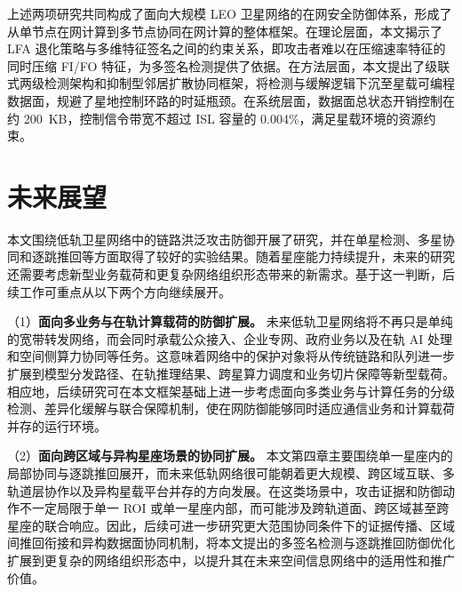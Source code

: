 上述两项研究共同构成了面向大规模 LEO 卫星网络的在网安全防御体系，形成了从单节点在网计算到多节点协同在网计算的整体框架。在理论层面，本文揭示了 LFA 退化策略与多维特征签名之间的约束关系，即攻击者难以在压缩速率特征的同时压缩 FI/FO 特征，为多签名检测提供了依据。在方法层面，本文提出了级联式两级检测架构和抑制型邻居扩散协同框架，将检测与缓解逻辑下沉至星载可编程数据面，规避了星地控制环路的时延瓶颈。在系统层面，数据面总状态开销控制在约 200~KB，控制信令带宽不超过 ISL 容量的 0.004\%，满足星载环境的资源约束。

\section{未来展望}

本文围绕低轨卫星网络中的链路洪泛攻击防御开展了研究，并在单星检测、多星协同和逐跳推回等方面取得了较好的实验结果。随着星座能力持续提升，未来的研究还需要考虑新型业务载荷和更复杂网络组织形态带来的新需求。基于这一判断，后续工作可重点从以下两个方向继续展开。

（1）\textbf{面向多业务与在轨计算载荷的防御扩展。} 未来低轨卫星网络将不再只是单纯的宽带转发网络，而会同时承载公众接入、企业专网、政府业务以及在轨 AI 处理和空间侧算力协同等任务。这意味着网络中的保护对象将从传统链路和队列进一步扩展到模型分发路径、在轨推理结果、跨星算力调度和业务切片保障等新型载荷。相应地，后续研究可在本文框架基础上进一步考虑面向多类业务与计算任务的分级检测、差异化缓解与联合保障机制，使在网防御能够同时适应通信业务和计算载荷并存的运行环境。

（2）\textbf{面向跨区域与异构星座场景的协同扩展。} 本文第四章主要围绕单一星座内的局部协同与逐跳推回展开，而未来低轨网络很可能朝着更大规模、跨区域互联、多轨道层协作以及异构星载平台并存的方向发展。在这类场景中，攻击证据和防御动作不一定局限于单一 ROI 或单一星座内部，而可能涉及跨轨道面、跨区域甚至跨星座的联合响应。因此，后续可进一步研究更大范围协同条件下的证据传播、区域间推回衔接和异构数据面协同机制，将本文提出的多签名检测与逐跳推回防御优化扩展到更复杂的网络组织形态中，以提升其在未来空间信息网络中的适用性和推广价值。
